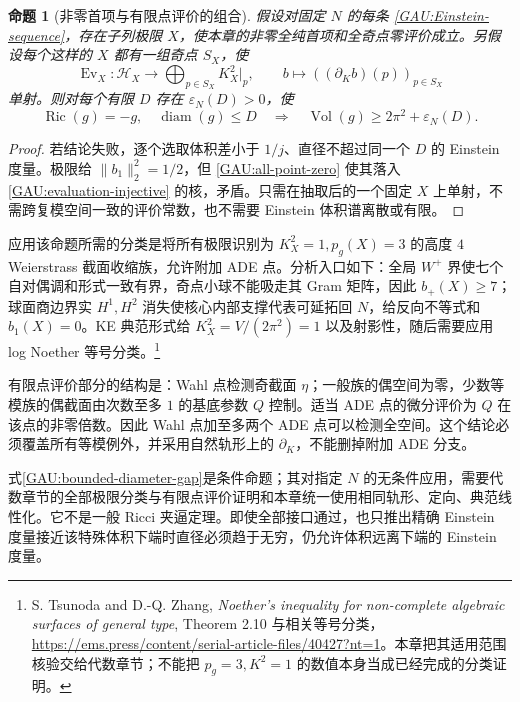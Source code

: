 \documentclass[UTF8,fontset=fandol,zihao=-4,oneside,openany]{ctexbook}
\theoremstyle{cjkplain}
\newtheorem{proposition}[theorem]{命题}
\numberwithin{equation}{chapter}
\begin{document}
\begin{proposition}[非零首项与有限点评价的组合]\label{GAU:gap-conditional}
假设对固定 $N$ 的每条 \eqref{GAU:Einstein-sequence}，存在子列极限 $X$，使本章的非零全纯首项和全奇点零评价成立。另假设每个这样的 $X$ 都有一组奇点 $S_X$，使
\begin{equation}\label{GAU:evaluation-injective}
\operatorname{Ev}_X:\mathcal H_X\longrightarrow
\bigoplus_{p\in S_X}K_X^2|_p,
\qquad b\longmapsto((\partial_Kb)(p))_{p\in S_X}
\end{equation}
单射。则对每个有限 $D$ 存在 $\varepsilon_N(D)>0$，使
\begin{equation}\label{GAU:bounded-diameter-gap}
\operatorname{Ric}(g)=-g,\quad\operatorname{diam}(g)\le D
\quad\Longrightarrow\quad
\operatorname{Vol}(g)\ge2\pi^2+\varepsilon_N(D).
\end{equation}
\end{proposition}
\begin{proof}
若结论失败，逐个选取体积差小于 $1/j$、直径不超过同一个 $D$ 的 Einstein 度量。极限给 $\|b_1\|_2^2=1/2$，但 \eqref{GAU:all-point-zero} 使其落入 \eqref{GAU:evaluation-injective} 的核，矛盾。只需在抽取后的一个固定 $X$ 上单射，不需跨复模空间一致的评价常数，也不需要 Einstein 体积谱离散或有限。
\end{proof}

应用该命题所需的分类是将所有极限识别为 $K_X^2=1,p_g(X)=3$ 的高度 $4$ Weierstrass 截面收缩族，允许附加 ADE 点。分析入口如下：全局 $W^+$ 界使七个自对偶调和形式一致有界，奇点小球不能吸走其 Gram 矩阵，因此 $b_+(X)\ge7$；球面商边界实 $H^1,H^2$ 消失使核心内部支撑代表可延拓回 $N$，给反向不等式和 $b_1(X)=0$。KE 典范形式给 $K_X^2=V/(2\pi^2)=1$ 以及射影性，随后需要应用 log Noether 等号分类。\footnote{S. Tsunoda and D.-Q. Zhang, \emph{Noether's inequality for non-complete algebraic surfaces of general type}, Theorem 2.10 与相关等号分类，\url{https://ems.press/content/serial-article-files/40427?nt=1}。本章把其适用范围核验交给代数章节；不能把 $p_g=3,K^2=1$ 的数值本身当成已经完成的分类证明。}

有限点评价部分的结构是：Wahl 点检测奇截面 $\eta$；一般族的偶空间为零，少数等模族的偶截面由次数至多 $1$ 的基底参数 $Q$ 控制。适当 ADE 点的微分评价为 $Q$ 在该点的非零倍数。因此 Wahl 点加至多两个 ADE 点可以检测全空间。这个结论必须覆盖所有等模例外，并采用自然轨形上的 $\partial_K$，不能删掉附加 ADE 分支。

式\eqref{GAU:bounded-diameter-gap}是条件命题；其对指定 $N$ 的无条件应用，需要代数章节的全部极限分类与有限点评价证明和本章统一使用相同轨形、定向、典范线性化。它不是一般 Ricci 夹逼定理。即使全部接口通过，也只推出精确 Einstein 度量接近该特殊体积下端时直径必须趋于无穷，仍允许体积远离下端的 Einstein 度量。
\end{document}

